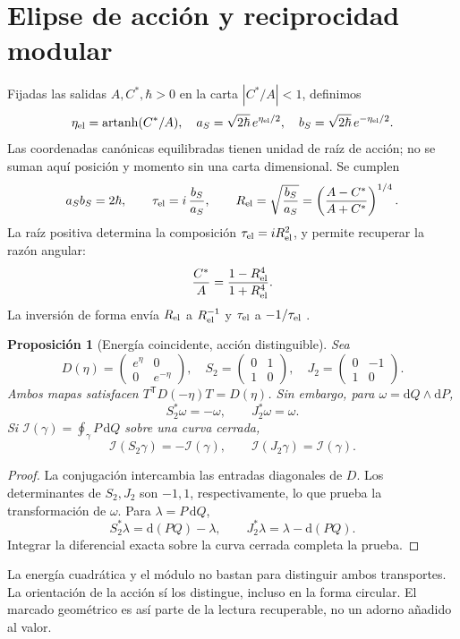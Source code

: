 \documentclass[11pt,a4paper]{article}
\numberwithin{equation}{section}
\newtheorem{proposition}[theorem]{Proposición}
\theoremstyle{definition}
\newcommand{\dd}{\mathrm d}
\begin{document}
\section{Elipse de acción y reciprocidad modular}
\label{sec:ellipse}
Fijadas las salidas $A,C^*,\hbar>0$ en la carta
$|C^*/A|<1$, definimos
\[
\eta_{\rm el}=\operatorname{artanh}(C^*/A),\quad
a_S=\sqrt{2\hbar}\,e^{\eta_{\rm el}/2},\quad
b_S=\sqrt{2\hbar}\,e^{-\eta_{\rm el}/2}.
\]
Las coordenadas canónicas equilibradas tienen unidad de raíz de acción;
no se suman aquí posición y momento sin una carta dimensional.
Se cumplen
\[
a_Sb_S=2\hbar,\qquad
\tau_{\rm el}=i\,\frac{b_S}{a_S},\qquad
R_{\rm el}=\sqrt{\frac{b_S}{a_S}}
=\left(\frac{A-C^*}{A+C^*}\right)^{1/4}.
\]
La raíz positiva determina la composición $\tau_{\rm el}=iR_{\rm el}^2$,
y permite recuperar la razón angular:
\[
\frac{C^*}{A}=\frac{1-R_{\rm el}^4}{1+R_{\rm el}^4}.
\]
La inversión de forma envía $R_{\rm el}$ a $R_{\rm el}^{-1}$ y
$\tau_{\rm el}$ a $-1/\tau_{\rm el}$ \cite{elipse}.

\begin{proposition}[Energía coincidente, acción distinguible]
Sea
\[
D(\eta)=\begin{pmatrix}e^\eta&0\\0&e^{-\eta}\end{pmatrix},
\quad
S_2=\begin{pmatrix}0&1\\1&0\end{pmatrix},
\quad
J_2=\begin{pmatrix}0&-1\\1&0\end{pmatrix}.
\]
Ambos mapas satisfacen $T^{\mathsf T}D(-\eta)T=D(\eta)$.
Sin embargo, para $\omega=\dd Q\wedge\dd P$,
\[
S_2^*\omega=-\omega,\qquad J_2^*\omega=\omega.
\]
Si $\mathcal I(\gamma)=\oint_\gamma P\,\dd Q$ sobre una curva cerrada,
\[
\mathcal I(S_2\gamma)=-\mathcal I(\gamma),\qquad
\mathcal I(J_2\gamma)=\mathcal I(\gamma).
\]
\end{proposition}
\begin{proof}
La conjugación intercambia las entradas diagonales de $D$.
Los determinantes de $S_2,J_2$ son $-1,1$, respectivamente, lo que
prueba la transformación de $\omega$. Para $\lambda=P\,\dd Q$,
\[
S_2^*\lambda=\dd(PQ)-\lambda,\qquad
J_2^*\lambda=\lambda-\dd(PQ).
\]
Integrar la diferencial exacta sobre la curva cerrada completa la prueba.
\end{proof}

La energía cuadrática y el módulo no bastan para distinguir ambos
transportes. La orientación de la acción sí los distingue, incluso
en la forma circular. El marcado geométrico es así parte de la lectura
recuperable, no un adorno añadido al valor.
\end{document}
